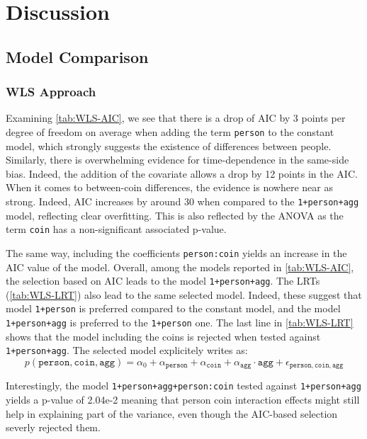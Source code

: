 \documentclass[a4paper, 12pt,oneside]{article}
\begin{document}
	\section{Discussion}
		\subsection{Model Comparison}
		\subsubsection{WLS Approach}
		Examining \ref{tab:WLS-AIC}, we see that there is a drop of AIC by 3 points per degree of freedom on average when adding the term \texttt{person} to the constant model, which strongly suggests the existence of differences between people. Similarly, there is overwhelming evidence for time-dependence in the same-side bias. Indeed, the addition of the  covariate allows a drop by 12 points in the AIC. When it comes to between-coin differences, the evidence is nowhere near as strong. Indeed, AIC increases by around 30 when compared to the \texttt{1+person+agg} model, reflecting clear overfitting. This is also reflected by the ANOVA as the term \texttt{coin} has a non-significant associated p-value.

		The same way, including the coefficients \texttt{person:coin} yields an increase in the AIC value of the model. 
		Overall, among the models reported in \ref{tab:WLS-AIC}, the selection based on AIC leads to the model \texttt{1+person+agg}. 
		The LRTs (\ref{tab:WLS-LRT}) also lead to the same selected model. Indeed, these suggest that model \texttt{1+person} is preferred compared to the constant model, and the model \texttt{1+person+agg} is preferred to the \texttt{1+person} one. The last line in \ref{tab:WLS-LRT} shows that the model including the coins is rejected when tested against \texttt{1+person+agg}. The selected model explicitely writes as:  
		\begin{equation}
			\label{eq:wls_model}
			p(\texttt{person},\texttt{coin},\texttt{agg}) = \alpha_0 + \alpha_{\texttt{person}}+\alpha_{\texttt{coin}} +\alpha_{\texttt{agg}}\cdot\texttt{agg} + \epsilon_{\texttt{person},\texttt{coin},\texttt{agg}}
		\end{equation}   

		Interestingly, the model \texttt{1+person+agg+person:coin} tested against \texttt{1+person+agg} yields a p-value of 2.04e-2 meaning that person coin interaction effects might still help in explaining part of the variance, even though the AIC-based selection severly rejected them. 
\end{document}
